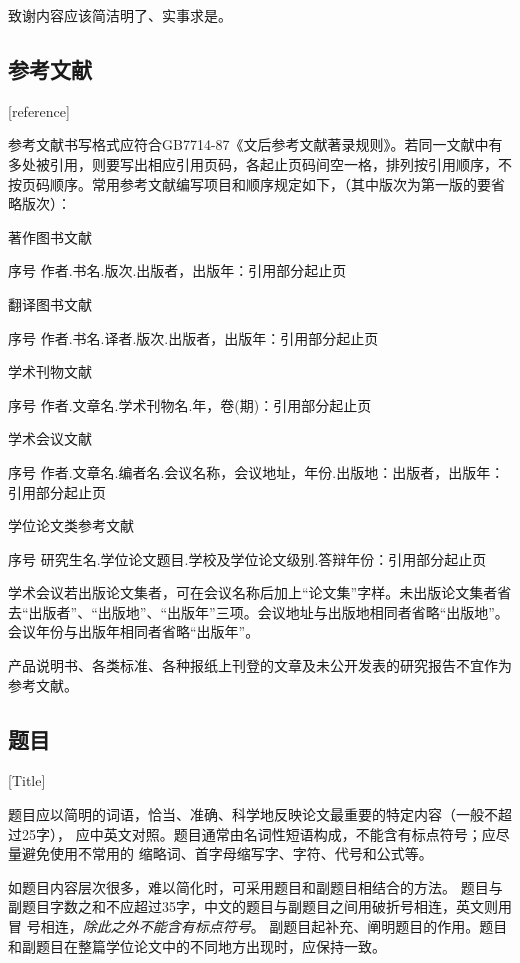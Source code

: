 致谢内容应该简洁明了、实事求是。

\subsection{参考文献}[reference]

参考文献书写格式应符合GB7714-87《文后参考文献著录规则》。若同一文献中有多处被引用，则要写出相应引用页码，各起止页码间空一格，排列按引用顺序，不按页码顺序。常用参考文献编写项目和顺序规定如下，（其中版次为第一版的要省略版次）：

著作图书文献

序号 \quad  作者.书名.版次.出版者，出版年：引用部分起止页

翻译图书文献

序号 \quad  作者.书名.译者.版次.出版者，出版年：引用部分起止页

学术刊物文献

序号 \quad  作者.文章名.学术刊物名.年，卷(期)：引用部分起止页

学术会议文献

序号 \quad  作者.文章名.编者名.会议名称，会议地址，年份.出版地：出版者，出版年：引用部分起止页

学位论文类参考文献

序号 \quad   研究生名.学位论文题目.学校及学位论文级别.答辩年份：引用部分起止页

学术会议若出版论文集者，可在会议名称后加上“论文集”字样。未出版论文集者省去“出版者”、“出版地”、“出版年”三项。会议地址与出版地相同者省略“出版地”。会议年份与出版年相同者省略“出版年”。

产品说明书、各类标准、各种报纸上刊登的文章及未公开发表的研究报告不宜作为参考文献。









\subsection{题目}[Title]

题目应以简明的词语，恰当、准确、科学地反映论文最重要的特定内容（一般不超过25字），
应中英文对照。题目通常由名词性短语构成，不能含有标点符号；应尽量避免使用不常用的
缩略词、首字母缩写字、字符、代号和公式等。

如题目内容层次很多，难以简化时，可采用题目和副题目相结合的方法。
题目与副题目字数之和不应超过35字，中文的题目与副题目之间用破折号相连，英文则用冒
号相连，\emph{除此之外不能含有标点符号}。
副题目起补充、阐明题目的作用。题目和副题目在整篇学位论文中的不同地方出现时，应保持一致。

